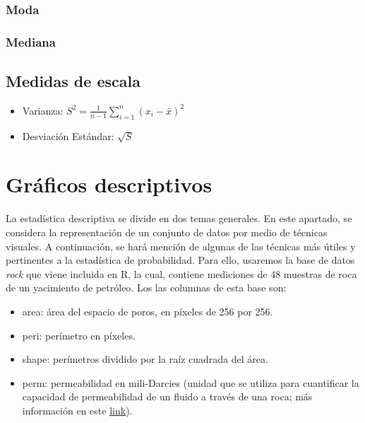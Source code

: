 \documentclass[
]{book}
\providecommand{\tightlist}{%
  \setlength{\itemsep}{0pt}\setlength{\parskip}{0pt}}
\begin{document}
\hypertarget{moda}{%
\subsubsection*{Moda}\label{moda}}

\hypertarget{mediana}{%
\subsubsection*{Mediana}\label{mediana}}

\hypertarget{medidas-de-escala}{%
\subsection{Medidas de escala}\label{medidas-de-escala}}

\begin{itemize}
\tightlist
\item
  Varianza: \(S^2 = \displaystyle{\frac{1}{n-1}\sum_{i=1}^n (x_i-\bar{x})^2}\)
\item
  Desviación Estándar: \(\sqrt{S}\)
\end{itemize}

\hypertarget{gruxe1ficos-descriptivos}{%
\section{Gráficos descriptivos}\label{gruxe1ficos-descriptivos}}

La estadística descriptiva se divide en dos temas generales. En este apartado, se considera la representación de un conjunto de datos por medio de técnicas visuales. A continuación, se hará mención de algunas de las técnicas más útiles y pertinentes a la estadística de probabilidad. Para ello, usaremos la base de datos \emph{rock} que viene incluida en R, la cual, contiene mediciones de 48 muestras de roca de un yacimiento de petróleo. Los las columnas de esta base son:

\begin{itemize}
\tightlist
\item
  area: área del espacio de poros, en píxeles de 256 por 256.
\item
  peri: perímetro en píxeles.
\item
  shape: perímetros dividido por la raíz cuadrada del área.
\item
  perm: permeabilidad en mili-Darcies (unidad que se utiliza para cuantificar la capacidad de permeabilidad de un fluido a través de una roca; más información en este \href{https://en.wikipedia.org/wiki/Darcy_(unit)}{link}).
\end{itemize}
\end{document}
